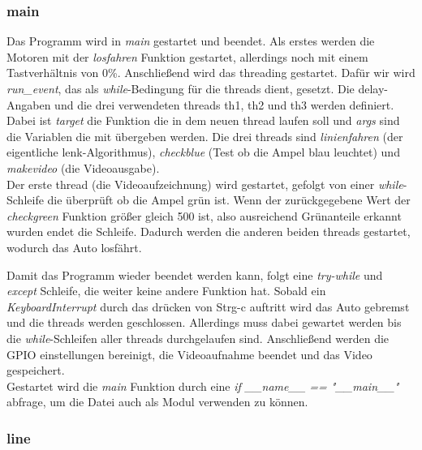 \documentclass[a4paper, 12pt]{scrartcl}
\begin{document}
\newpage
\subsubsection{main}	%


Das Programm wird in \textit{main} gestartet und beendet. Als erstes werden die Motoren mit der \textit{losfahren} Funktion gestartet, allerdings noch mit einem Tastverhältnis von 0\%.
Anschließend wird das threading gestartet. Dafür wir wird \textit{run\_event}, das als \textit{while}-Bedingung für die threads dient, gesetzt. Die delay-Angaben und die drei verwendeten threads th1, th2 und th3 werden definiert. Dabei ist \textit{target} die Funktion die in dem neuen thread laufen soll und \textit{args} sind die Variablen die mit übergeben werden.
Die drei threads sind \textit{linienfahren} (der eigentliche lenk-Algorithmus), \textit{checkblue} (Test ob die Ampel blau leuchtet) und \textit{makevideo} (die Videoausgabe).\\

Der erste thread (die Videoaufzeichnung) wird gestartet, gefolgt von einer \textit{while}-Schleife die überprüft ob die Ampel grün ist. Wenn der zurückgegebene Wert der \textit{checkgreen} Funktion größer gleich 500 ist, also ausreichend Grünanteile erkannt wurden endet die Schleife. Dadurch werden die anderen beiden threads gestartet, wodurch das Auto losfährt.

Damit das Programm wieder beendet werden kann, folgt eine \textit{try-while} und \textit{except} Schleife, die weiter keine andere Funktion hat. Sobald ein \textit{KeyboardInterrupt} durch das drücken von Strg-c auftritt wird das Auto gebremst und die threads werden geschlossen. Allerdings muss dabei gewartet werden bis die \textit{while}-Schleifen aller threads durchgelaufen sind. Anschließend werden die GPIO einstellungen bereinigt, die Videoaufnahme beendet und das Video gespeichert.\\

Gestartet wird die \textit{main} Funktion durch eine \textit{if \_\_name\_\_ == "\_\_main\_\_"} abfrage, um die Datei auch als Modul verwenden zu können.

\newpage
\subsubsection{line}	%

\end{document}
